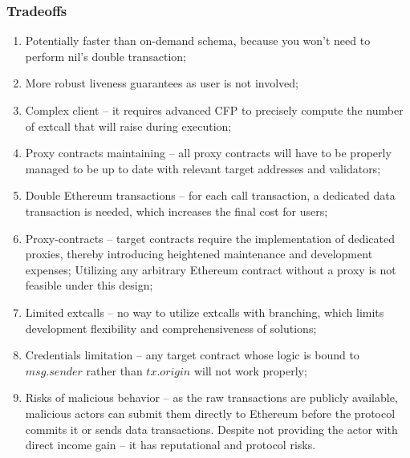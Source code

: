 \subsubsection{Tradeoffs}
\begin{enumerate}
    \item Potentially faster than on-demand schema, because you won't need to perform nil's 
    double transaction;
    \item More robust liveness guarantees as user is not involved;
    \item Complex client -- it requires advanced CFP to precisely compute the number of extcall 
    that will raise during execution;
    \item Proxy contracts maintaining -- all proxy contracts will have to be properly managed to 
    be up to date with relevant target addresses and validators;
    \item Double Ethereum transactions -- for each call transaction, a dedicated data 
    transaction is needed, which increases the final cost for users;
    \item Proxy-contracts -- target contracts require the implementation of dedicated proxies, 
    thereby introducing heightened maintenance and development expenses;
    Utilizing any arbitrary Ethereum contract without a proxy is not feasible under this design;
    \item Limited extcalls -- no way to utilize extcalls with branching, which limits 
    development flexibility and comprehensiveness of solutions;
    \item Credentials limitation -- any target contract whose logic is bound to \(msg.sender\) 
    rather than \(tx.origin\) will not work properly;
    \item Risks of malicious behavior -- as the raw transactions are publicly available, malicious
    actors can submit them directly to Ethereum before the protocol commits it or sends data transactions.
    Despite not providing the actor with direct income gain -- it has reputational and protocol risks. 

\end{enumerate}
